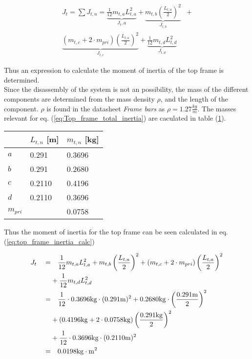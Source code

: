 \documentclass[../../main]{subfiles}
\begin{document}
\begin{equation}
  \label{eq:Top_frame_total_inertia}
\begin{split}
  J_t = \sum J_{t,n} =
  \underbrace{\frac{1}{12}m_{t,a}L_{t,a}^2}_\text{$J_t,a$} +
  \underbrace{m_{t,b}\left(\frac{L_{t,a}}{2}\right)^2}_\text{$J_{t,b}$} &+ \\
  \underbrace{(m_{t,c} + 2\cdot m_{pri})\left(\frac{L_{t,a}}{2}\right)^2}_\text{$J_{t,c}$} +
  \underbrace{\frac{1}{12}m_{t,d}L_{t,d}^2}_\text{$J_{t,d}$}
\end{split}
\end{equation}

Thus an expression to calculate the moment of inertia of the top frame is determined.\\

Since the disassembly of the system is not an possibility, the mass of the different components are determined from the mass density $\rho$, and the length of the component. $\rho$ is found in the datasheet \textit{Frame bars} as $\rho = 1.27 \frac{kg}{m}$. The masses relevant for eq. (\ref{eq:Top_frame_total_inertia}) are caculated in table (\ref{tab:mass_table}).

\begin{table}[H]
\centering
\begin{tabular}{|l|l|l|}
\hline
  & $L_{t,n}$ [m]  & $m_{t,n}$ [kg]  \\
\hline
$a$ & 0.291  & 0.3696  \\
\hline
$b$ & 0.291  & 0.2680  \\
\hline
$c$ & 0.2110 & 0.4196  \\
\hline
$d$ & 0.2110 & 0.3696  \\
\hline
$m_{pri}$ & & 0.0758 \\
\hline
\end{tabular}
    \label{tab:mass_table}
\end{table}

Thus the moment of inertia for the top frame can be seen calculated in eq. (\ref{eq:top_frame_inertia_calc})

\begin{equation}
  \centering
    \label{eq:top_frame_inertia_calc}
  \begin{split}
      J_t  \quad  =&  \quad \frac{1}{12} m_{t,a}L_{t,a}^2 + m_{t,b}\left(\frac{L_{t,a}}{2}\right)^2 + (m_{t,c} + 2\cdot m_{pri})\left(\frac{L_{t,a}}{2}\right)^2 \\
      &+ \frac{1}{12}m_{t,d}L_{t,d}^2 \\
      =& \quad  \frac{1}{12} \cdot 0.3696 \si{kg}  \cdot (0.291 \si{m})^2 + 0.2680 \si{kg} \cdot \left(\frac{0.291 \si{m}}{2}\right)^2 \\
      &+ (0.4196 \si{kg} + 2\cdot 0.0758 \si{kg})\left(\frac{0.291\si{kg}}{2}\right)^2 \\
      &+ \frac{1}{12} \cdot 0.3696\si{kg} \cdot (0.2110\si{m})^2 \\
      =& \quad 0.0198 \si{kg\cdot m^2}
  \end{split}
\end{equation}
\end{document}
